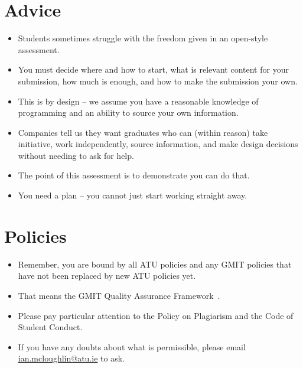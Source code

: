 \documentclass[a4paper]{tufte-handout}
\begin{document}
\section{Advice}
\begin{itemize}
  \item Students sometimes struggle with the freedom given in an open-style assessment.
  \item You must decide where and how to start, what is relevant content for your submission, how much is enough, and how to make the submission your own.
  \item This is by design -- we assume you have a reasonable knowledge of programming and an ability to source your own information.
  \item Companies tell us they want graduates who can (within reason) take initiative, work independently, source information, and make design decisions without needing to ask for help.
  \item The point of this assessment is to demonstrate you can do that.
  \item You need a plan -- you cannot just start working straight away.
\end{itemize}


\section{Policies}
\begin{itemize}
  \item Remember, you are bound by all ATU policies and any GMIT policies that have not been replaced by new ATU policies yet.
  \item That means the GMIT Quality Assurance Framework~\cite{gmitqaf}.
  \item Please pay particular attention to the Policy on Plagiarism and the Code of Student Conduct.
  \item If you have any doubts about what is permissible, please email \url{ian.mcloughlin@atu.ie} to ask.
\end{itemize}


\end{document}
